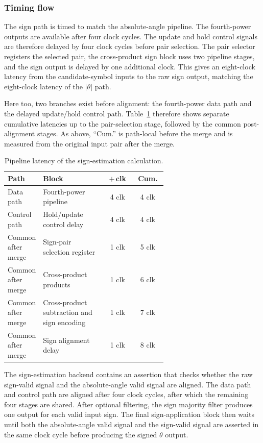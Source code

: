 \subsubsection{Timing flow}

The sign path is timed to match the absolute-angle pipeline. The fourth-power outputs are available after four clock cycles. The update and hold control signals are therefore delayed by four clock cycles before pair selection. The pair selector registers the selected pair, the cross-product sign block uses two pipeline stages, and the sign output is delayed by one additional clock. This gives an eight-clock latency from the candidate-symbol inputs to the raw sign output, matching the eight-clock latency of the \( |\theta| \) path.

Here too, two branches exist before alignment: the fourth-power data path and the delayed update/hold control path. Table~\ref{tab:sign-estimation-latency} therefore shows separate cumulative latencies up to the pair-selection stage, followed by the common post-alignment stages. As above, ``Cum.'' is path-local before the merge and is measured from the original input pair after the merge.

\begin{table}[h]
    \centering
    \caption{Pipeline latency of the sign-estimation calculation.}
    \label{tab:sign-estimation-latency}
    \small
    \begin{tabular}{p{0.22\linewidth} p{0.40\linewidth} c c}
        \hline
        Path & Block & $+\,$clk & Cum. \\
        \hline
        Data path & Fourth-power pipeline & 4 clk & 4 clk \\
        Control path & Hold/update control delay & 4 clk & 4 clk \\
        Common after merge & Sign-pair selection register & 1 clk & 5 clk \\
        Common after merge & Cross-product products & 1 clk & 6 clk \\
        Common after merge & Cross-product subtraction and sign encoding & 1 clk & 7 clk \\
        Common after merge & Sign alignment delay & 1 clk & 8 clk \\
        \hline
    \end{tabular}
\end{table}

The sign-estimation backend contains an assertion that checks whether the raw sign-valid signal and the absolute-angle valid signal are aligned. The data path and control path are aligned after four clock cycles, after which the remaining four stages are shared. After optional filtering, the sign majority filter produces one output for each valid input sign. The final sign-application block then waits until both the absolute-angle valid signal and the sign-valid signal are asserted in the same clock cycle before producing the signed \(\theta\) output.

